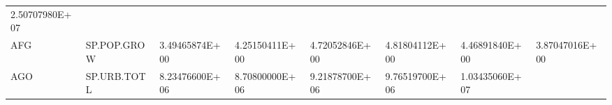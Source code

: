 \documentclass[]{article}
\begin{document}
\begin{longtable}[]{@{}llllllll@{}}
\begin{minipage}[t]{0.11\columnwidth}
2.50707980E+07\strut
\end{minipage}\tabularnewline
\begin{minipage}[t]{0.06\columnwidth}\raggedright
AFG\strut
\end{minipage} & \begin{minipage}[t]{0.08\columnwidth}\raggedright
SP.POP.GROW\strut
\end{minipage} & \begin{minipage}[t]{0.11\columnwidth}\raggedright
3.49465874E+00\strut
\end{minipage} & \begin{minipage}[t]{0.11\columnwidth}\raggedright
4.25150411E+00\strut
\end{minipage} & \begin{minipage}[t]{0.11\columnwidth}\raggedright
4.72052846E+00\strut
\end{minipage} & \begin{minipage}[t]{0.11\columnwidth}\raggedright
4.81804112E+00\strut
\end{minipage} & \begin{minipage}[t]{0.11\columnwidth}\raggedright
4.46891840E+00\strut
\end{minipage} & \begin{minipage}[t]{0.11\columnwidth}\raggedright
3.87047016E+00\strut
\end{minipage}\tabularnewline
\begin{minipage}[t]{0.06\columnwidth}\raggedright
AGO\strut
\end{minipage} & \begin{minipage}[t]{0.08\columnwidth}\raggedright
SP.URB.TOTL\strut
\end{minipage} & \begin{minipage}[t]{0.11\columnwidth}\raggedright
8.23476600E+06\strut
\end{minipage} & \begin{minipage}[t]{0.11\columnwidth}\raggedright
8.70800000E+06\strut
\end{minipage} & \begin{minipage}[t]{0.11\columnwidth}\raggedright
9.21878700E+06\strut
\end{minipage} & \begin{minipage}[t]{0.11\columnwidth}\raggedright
9.76519700E+06\strut
\end{minipage} & \begin{minipage}[t]{0.11\columnwidth}\raggedright
1.03435060E+07\strut
\end{minipage} & \begin{minipage}[t]{0.11\columnwidth}\raggedright

\end{minipage}
\end{longtable}
\end{document}
